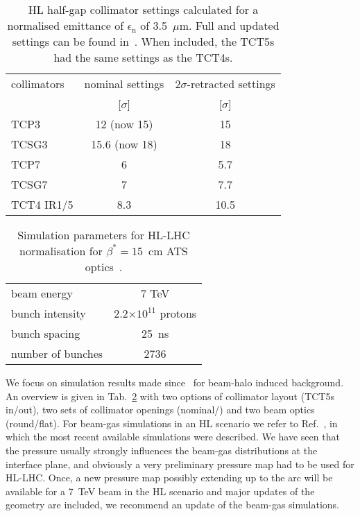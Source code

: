  \begin{table}%
   \centering
   \caption{HL half-gap collimator settings calculated for a normalised emittance of $\epsilon_{\mathrm{n}}$ of 3.5~$\mu$m. Full and updated settings can be found in~\cite{collSettRef}. When included, the TCT5s had the same settings as the TCT4s.}

   \begin{tabular}{l|c|c}
       \hline
       collimators &        nominal settings & $2\sigma$-retracted settings\\
                   &         [$\sigma$] &  [$\sigma$]\\
       \hline
       TCP3 & 12 (now 15) & 15 \\
       TCSG3 & 15.6 (now 18)& 18 \\
       TCP7 & 6 & 5.7 \\
       TCSG7 & 7 & 7.7 \\
       TCT4 IR1/5 & 8.3 & 10.5 \\
       \hline
   \end{tabular}
   \label{HLcollSettings}
\end{table}

\begin{table}%
   \centering
   \caption{Simulation parameters for HL-LHC normalisation for $\beta^* = 15$~cm ATS optics~\cite{ATSref}.}
   \begin{tabular}{l|c}
       \hline
       beam energy & 7 TeV \\
       bunch intensity & 2.2$\times 10^{11}$ protons\\
       bunch spacing & 25~ns \\
       number of bunches & 2736 \\
       \hline
   \end{tabular}
   \label{hlscenario}
\end{table}


We focus on simulation results made since~\cite{kweeIpac14} for beam-halo induced background. An overview is given in Tab.~\ref{hlscenario} with two options of collimator layout (TCT5s in/out), two sets of collimator openings (nominal/\twosigmaret) and two beam optics (round/flat). For beam-gas simulations in an HL scenario we refer to Ref.~\cite{kweeIpac14}, in which the most recent available simulations were described. We have seen that the pressure usually strongly influences the beam-gas distributions at the interface plane, and obviously a very preliminary pressure map had to be used for HL-LHC. Once, a new pressure map possibly extending up to the arc will be available for a 7~TeV beam in the HL scenario and major updates of the geometry are included, we recommend an update of the beam-gas simulations. 

